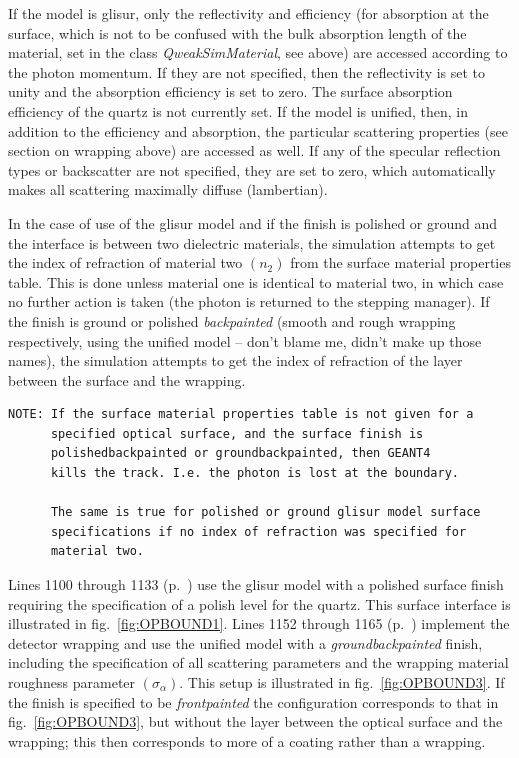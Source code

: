 If the model is glisur, only the reflectivity and efficiency (for
absorption at the surface, which is not to be confused with the bulk
absorption length of the material, set in the class {\it
QweakSimMaterial}, see above) are accessed according to the photon
momentum. If they are not specified, then the reflectivity is set to
unity and the absorption efficiency is set to zero. The surface
absorption efficiency of the quartz is not currently set. If the model
is unified, then, in addition to the efficiency and absorption, the
particular scattering properties (see section on wrapping above) are
accessed as well. If any of the specular reflection types or
backscatter are not specified, they are set to zero, which
automatically makes all scattering maximally diffuse (lambertian). 

In the case of use of the glisur model and if the finish is polished
or ground and the interface is between two dielectric materials, the
simulation attempts to get the index of refraction of material two
$(n_2)$ from the surface material properties table. This is done
unless material one is identical to material two, in which case no
further action is taken (the photon is returned to the stepping
manager). If the finish is ground or polished {\em backpainted}
(smooth and rough wrapping respectively, using the unified model --
don't blame me, didn't make up those names), the simulation attempts
to get the index of refraction of the layer between the surface and
the wrapping.

\begin{verbatim}
NOTE: If the surface material properties table is not given for a
      specified optical surface, and the surface finish is
      polishedbackpainted or groundbackpainted, then GEANT4
      kills the track. I.e. the photon is lost at the boundary.

      The same is true for polished or ground glisur model surface
      specifications if no index of refraction was specified for
      material two. 
\end{verbatim}

Lines 1100 through 1133 (p.~\pageref{SourceV18}) use the glisur model
with a polished surface finish requiring the specification of a polish
level for the quartz. This surface interface is illustrated in
fig.~\ref{fig:OPBOUND1}. Lines 1152 through 1165
(p.~\pageref{SourceV19}) implement the detector wrapping and use the
unified model with a {\em groundbackpainted} finish, including the
specification of all scattering parameters and the wrapping material
roughness parameter $(\sigma_{\alpha})$.  This setup is illustrated in
fig.~\ref{fig:OPBOUND3}. If the finish is specified to be {\em
frontpainted} the configuration corresponds to that in
fig.~\ref{fig:OPBOUND3}, but without the layer between the optical
surface and the wrapping; this then corresponds to more of a coating
rather than a wrapping. 

